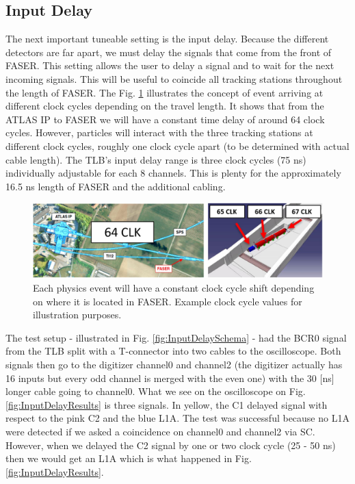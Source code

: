 \subsection{Input Delay}

The next important tuneable setting is the input delay. Because the different detectors are far apart, we must delay the signals that come from the front of FASER. This setting allows the user to delay a signal and to wait for the next incoming signals. This will be useful to coincide all tracking stations throughout the length of FASER. The Fig. \ref{fig:InputDelay} illustrates the concept of event arriving at different clock cycles depending on the travel length. It shows that from the ATLAS IP to FASER we will have a constant time delay of around 64 clock cycles. However, particles will interact with the three tracking stations at different clock cycles, roughly one clock cycle apart (to be determined with actual cable length). The TLB's input delay range is three clock cycles (75 ns) individually adjustable for each 8 channels. This is plenty for the approximately 16.5 ns length of FASER and the additional cabling.

\begin{figure}[htbp!] 
\centering    
\includegraphics[width=1.0\textwidth]{InputDelayIllustration.jpg}
\caption[Input Delay illustration]{Each physics event will have a constant clock cycle shift depending on where it is located in FASER. Example clock cycle values for illustration purposes.}
\label{fig:InputDelay}
\end{figure}

The test setup - illustrated in Fig. \ref{fig:InputDelaySchema} - had the BCR0 signal from the TLB split with a T-connector into two cables to the oscilloscope. Both signals then go to the digitizer channel0 and channel2 (the digitizer actually has 16 inputs but every odd channel is merged with the even one) with the 30 [ns] longer cable going to channel0. What we see on the oscilloscope on Fig. \ref{fig:InputDelayResults} is three signals. In yellow, the C1 delayed signal with respect to the pink C2 and the blue L1A. The test was successful because no L1A were detected if we asked a coincidence on channel0 and channel2 via SC. However, when we delayed the C2 signal by one or two clock cycle (25 - 50  ns) then we would get an L1A which is what happened in Fig. \ref{fig:InputDelayResults}.

